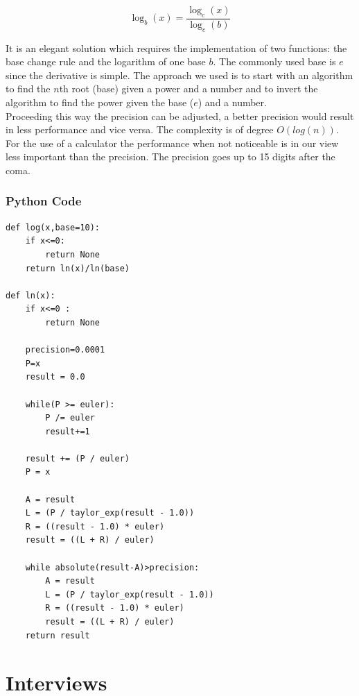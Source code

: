 \documentclass[11pt,onside]{report}
\begin{document}
\begin{equation} \label{log-rule}
    \log_b(x) = \frac{\log_c(x)}{\log_c(b)}
\end{equation}

It is an elegant solution which requires the implementation of two functions: the base change rule and the logarithm of one base $b$. The commonly used base is $e$ since the derivative is simple. The approach we used is to start with an algorithm to find the $n$th root (base) given a power and a number and to invert the algorithm to find the power given the base ($e$) and a number. \\

Proceeding this way the precision can be adjusted, a better precision would result in less performance and vice versa. The complexity is of degree $O(log(n))$. For the use of a calculator the performance when not noticeable is in our view less important than the precision. The precision goes up to 15 digits after the coma.

\subsubsection{Python Code}
\begin{lstlisting}
def log(x,base=10):
    if x<=0:
        return None
    return ln(x)/ln(base)

def ln(x):
    if x<=0 :
        return None

    precision=0.0001
    P=x
    result = 0.0

    while(P >= euler):
        P /= euler
        result+=1

    result += (P / euler)
    P = x

    A = result
    L = (P / taylor_exp(result - 1.0))
    R = ((result - 1.0) * euler)
    result = ((L + R) / euler)

    while absolute(result-A)>precision:
        A = result
        L = (P / taylor_exp(result - 1.0))
        R = ((result - 1.0) * euler)
        result = ((L + R) / euler)
    return result
\end{lstlisting}

\section{Interviews}
\end{document}
